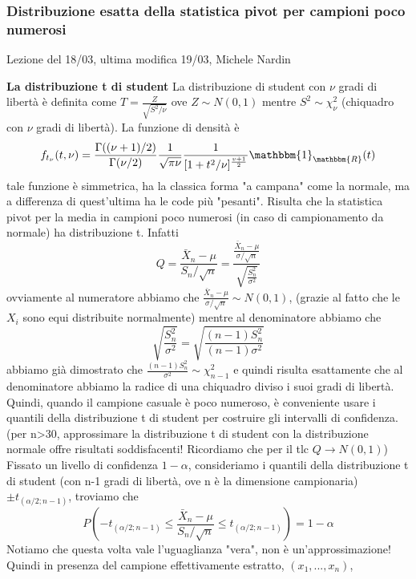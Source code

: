 
\subsubsection{Distribuzione esatta della statistica pivot per campioni poco numerosi}

Lezione del 18/03, ultima modifica 19/03, Michele Nardin

\textbf{La distribuzione t di student}
La distribuzione di student con $\nu$ gradi di libertà è definita come 
$T=\frac{Z}{\sqrt{S^2 / \nu}}$ ove $Z \sim N(0,1)$ mentre $S^2 \sim \chi^2_\nu$ (chiquadro con $\nu$ gradi di libertà).
La funzione di densità è $$f_{t_\nu}(t,\nu)=\frac{\Gamma((\nu + 1)/2)}{\Gamma(\nu / 2)}
\frac{1}{\sqrt{\pi \nu}} \frac{1}{[1+t^2/\nu]^{\frac{v+1}{2}}} \mathbbm{1}_\mathbbm{R} (t)$$
tale funzione è simmetrica, ha la classica forma "a campana" come la normale, ma a differenza di quest'ultima ha le code più "pesanti".
Risulta che la statistica pivot per la media in campioni poco numerosi (in caso di campionamento da normale) ha distribuzione t. Infatti 
$$Q=\frac{\bar{X}_n - \mu}{S_n / \sqrt{n}}=\frac{\frac{\bar{X}_n - \mu}{\sigma / \sqrt{n}}}{\sqrt{\frac{S^2_n}{\sigma^2}}}$$
ovviamente al numeratore abbiamo che $\frac{\bar{X}_n - \mu}{\sigma / \sqrt{n}} \sim N(0,1)$, (grazie al fatto che le $X_i$ sono equi distribuite normalmente) 
mentre al denominatore abbiamo che 
$$\sqrt{\frac{S^2_n}{\sigma^2}}= \sqrt{\frac{(n-1)S^2_n}{(n-1) \sigma^2}}$$
abbiamo già dimostrato che $\frac{(n-1)S^2_n}{\sigma^2} \sim \chi^2_{n-1}$ e quindi risulta esattamente che al denominatore abbiamo la radice di una chiquadro diviso i suoi gradi di libertà.
Quindi, quando il campione casuale è poco numeroso, è conveniente usare i quantili della distribuzione t di student per costruire gli intervalli di confidenza. (per n>30, approssimare la distribuzione t di student con la distribuzione normale offre risultati soddisfacenti! Ricordiamo che per il tlc $Q\rightarrow N(0,1)$)
Fissato un livello di confidenza $1-\alpha$, consideriamo i quantili della distribuzione t di student 
(con n-1 gradi di libertà, ove n è la dimensione campionaria) 
$\pm t_{(\alpha/2;n-1)}$, 
troviamo che $$ P\left(-t_{(\alpha/2;n-1)} \leq \frac{\bar{X}_n - \mu}{S_n / \sqrt{n}}
 \leq t_{(\alpha/2;n-1)}\right) = 1 - \alpha $$
Notiamo che questa volta vale l'uguaglianza "vera", non è un'approssimazione! Quindi in presenza del campione effettivamente estratto, $(x_1,...,x_n)$, 